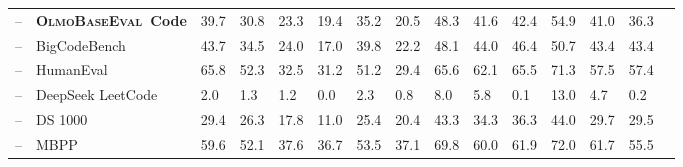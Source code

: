 \documentclass[table]{ai2style/ai2}
\newcommand{\olmothreeeval}{\textsc{OlmoBaseEval}\xspace}
\begin{document}
\begin{table}[t]
{{\begin{NiceTabular}{@{}Hl
P{38pt}C{38pt}C{38pt}C{38pt}C{38pt}C{38pt}|C{38pt}C{38pt}C{38pt}C{38pt}C{38pt}C{38pt}H@{}}
\midrule
{}   -- & {\textbf{\olmothreeeval \fontsize{9}{9}\selectfont~Code}}                                              & 39.7                    & 30.8               & 23.3                 & 19.4                 & 35.2                       & 20.5                  & 48.3                  & 41.6                 & 42.4                     & 54.9              & 41.0                 & 36.3                   \\
 -- & BigCodeBench                                                                                           & 43.7                    & 34.5               & 24.0                 & 17.0                 & 39.8                       & 22.2                  & 48.1                  & 44.0                 & 46.4                     & 50.7              & 43.4                 & 43.4                   \\
 -- & HumanEval                                                                                              & 65.8                    & 52.3               & 32.5                 & 31.2                 & 51.2                       & 29.4                  & 65.6                  & 62.1                 & 65.5                     & 71.3              & 57.5                 & 57.4                   \\
 -- & DeepSeek LeetCode                                                                                      & 2.0                     & 1.3                & 1.2                  & 0.0                  & 2.3                        & 0.8                   & 8.0                   & 5.8                  & 0.1                      & 13.0              & 4.7                  & 0.2                    \\
 -- & DS 1000                                                                                                & 29.4                    & 26.3               & 17.8                 & 11.0                 & 25.4                       & 20.4                  & 43.3                  & 34.3                 & 36.3                     & 44.0              & 29.7                 & 29.5                   \\
 -- & MBPP                                                                                                   & 59.6                    & 52.1               & 37.6                 & 36.7                 & 53.5                       & 37.1                  & 69.8                  & 60.0                 & 61.9                     & 72.0              & 61.7                 & 55.5                   \\

\end{NiceTabular}}}
\end{table}
\end{document}
